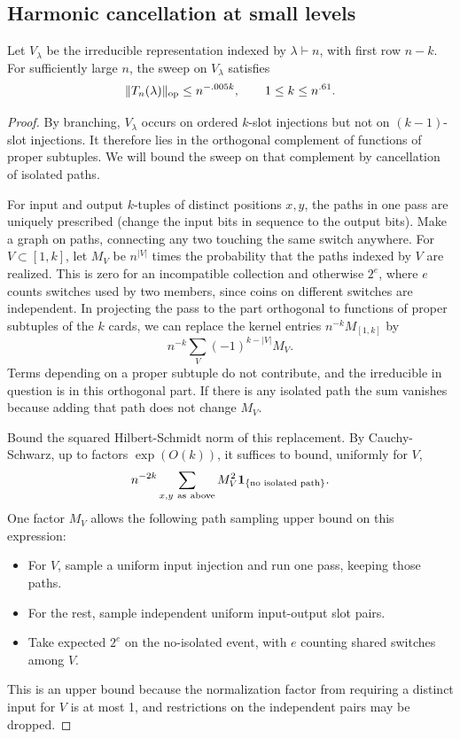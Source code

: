 \subsection{Harmonic cancellation at small levels}
\begin{lemma}\label{tra:conditional:sparse}
\label{tra:conditional:sparse-statement}
Let $V_\lambda$ be the irreducible representation indexed by
$\lambda\vdash n$, with first row $n-k$. For sufficiently large $n$,
the sweep on $V_\lambda$ satisfies
\begin{equation}
               \|T_n(\lambda)\|_{\rm op} \le n^{-.005 k},
                     \qquad 1\le k\le n^{.61}.                         \label{tra:conditional:eq5}
\end{equation}
\end{lemma}
\begin{proof}\label{tra:conditional:sparse-proof}
\label{tra:conditional:sparse-forest-proof}
By branching, $V_\lambda$ occurs on ordered $k$-slot injections but
not on $(k-1)$-slot injections. It therefore lies in the orthogonal
complement of functions of proper subtuples. We will bound the sweep
on that complement by cancellation of isolated paths.

For input and output \(k\)-tuples of distinct positions \(x,y\), the paths in one pass are uniquely prescribed (change the input bits in sequence to the output bits). Make a graph on paths, connecting any two touching the same switch anywhere. For \(V\subset[1,k]\), let \(M_V\) be \(n^{|V|}\) times the probability that the paths indexed by \(V\) are realized. This is zero for an incompatible collection and otherwise \(2^e\), where \(e\) counts switches used by two members, since coins on different switches are independent. In projecting the pass to the part orthogonal to functions of proper subtuples of the \(k\) cards, we can replace the kernel entries \(n^{-k}M_{[1,k]}\) by
\[
                      n^{-k}\sum_{V}(-1)^{k-|V|}M_V.
\]
Terms depending on a proper subtuple do not contribute, and the irreducible in question is in this orthogonal part. If there is any isolated path the sum vanishes because adding that path does not change \(M_V\).

Bound the squared Hilbert-Schmidt norm of this replacement. By Cauchy-Schwarz, up to factors \(\exp(O(k))\), it suffices to bound, uniformly for \(V\),
\[
          n^{-2k}\sum_{x,y\ \mathrm{as\ above}}
                        M_V^2 {\bf1}_{\{\text{no isolated path}\}}.
\]
One factor \(M_V\) allows the following path sampling upper bound on this expression:
\begin{itemize}
\item For \(V\), sample a uniform input injection and run one pass, keeping those paths.
\item For the rest, sample independent uniform input-output slot pairs.
\item Take expected \(2^e\) on the no-isolated event, with \(e\) counting shared switches among \(V\).
\end{itemize}
This is an upper bound because the normalization factor from requiring a distinct input for \(V\) is at most 1, and restrictions on the independent pairs may be dropped.


\end{proof}
